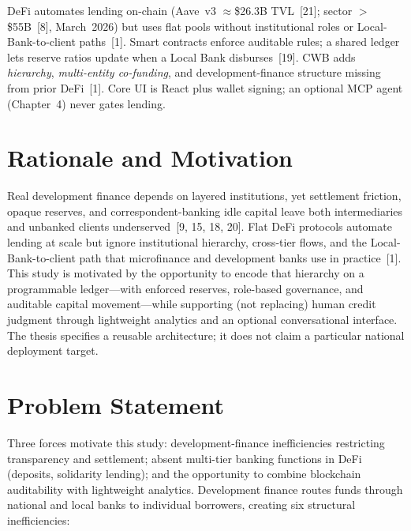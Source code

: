 \documentclass[12pt, a4paper]{report}
\begin{document}
DeFi automates lending on-chain (Aave~v3 $\approx$\$26.3B TVL~[21]; sector $>$\$55B~[8], March~2026) but uses flat pools without institutional roles or Local-Bank-to-client paths~[1]. Smart contracts enforce auditable rules; a shared ledger lets reserve ratios update when a Local Bank disburses~[19]. CWB adds \textit{hierarchy}, \textit{multi-entity co-funding}, and development-finance structure missing from prior DeFi~[1]. Core UI is React plus wallet signing; an optional MCP agent (Chapter~4) never gates lending.

\section{Rationale and Motivation}
\label{sec:rationale}

Real development finance depends on layered institutions, yet settlement friction, opaque reserves, and correspondent-banking idle capital leave both intermediaries and unbanked clients underserved~[9, 15, 18, 20]. Flat DeFi protocols automate lending at scale but ignore institutional hierarchy, cross-tier flows, and the Local-Bank-to-client path that microfinance and development banks use in practice~[1]. This study is motivated by the opportunity to encode that hierarchy on a programmable ledger---with enforced reserves, role-based governance, and auditable capital movement---while supporting (not replacing) human credit judgment through lightweight analytics and an optional conversational interface. The thesis specifies a reusable architecture; it does not claim a particular national deployment target.

\section{Problem Statement}

Three forces motivate this study: development-finance inefficiencies restricting transparency and settlement; absent multi-tier banking functions in DeFi (deposits, solidarity lending); and the opportunity to combine blockchain auditability with lightweight analytics. Development finance routes funds through national and local banks to individual borrowers, creating six structural inefficiencies:
\end{document}
